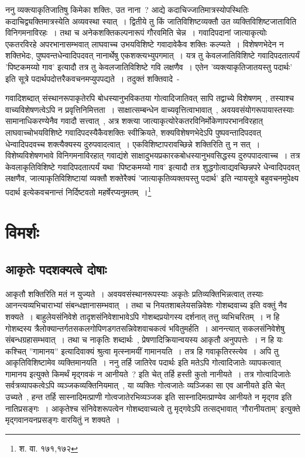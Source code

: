 		ननु व्यक्त्याकृतिजातिषु किमेका शक्तिः, उत नाना~? आद्ये कदाचिज्जातिमात्रस्योपस्थितिः कदाचिद्व्यक्तिमात्रस्येति अव्यवस्था स्यात्~। द्वितीये तु किं जातिविशिष्टव्यक्तौ उत व्यक्तिविशिष्टजाताविति विनिगमनाविरहः~। तथा च अनेकशक्तिकल्पनारूपं गौरवमिति चेन्न~। गवादिपदानां जात्याकृत्योः एकतरविरहे अपरभानासम्भवात् लाघवाच्च उभयविशिष्टे गवादावेकैव शक्तिः कल्प्यते~। विशेषणभेदेन न शक्तिभेदः, पुष्पवन्तधेन्वादिपदवत् नानार्थेषु एकशक्त्यभ्युपगमात्~। यत्र तु केवलजातिविशिष्टे गवादिपदतात्पर्यं 'पिष्टकमय्यो गाव' इत्यादौ तत्र तु केवलजातिविशिष्टे गवि लक्षणैव~। एतेन 'व्यक्त्याकृतिजातयस्तु पदार्थः' इति सूत्रे पदार्थपदोत्तरैकवचनमप्युपपद्यते~। तदुक्तं शक्तिवादे~- 

		{\fontsize{11.7}{0}\selectfont\s  गवादिशब्दात् संस्थानरूपाकृतेरपि बोधस्यानुभविकतया गोत्वादिजातिवत् सापि तद्वाच्ये विशेषणम्~, तस्याश्च वाच्यविशेषणत्वेऽपि न प्रवृत्तिनिमित्तता~। साक्षात्सम्बन्धेन वाच्यवृत्तित्वाभावात्~, अवयवसंयोगरूपायास्तस्याः सामानाधिकरण्येनैव गवादौ सत्त्वात्~, अत्र शक्त्या जात्याकृत्योरेकतरविनिर्मोकेणापरभानविरहात् लाघवाच्चोभयविशिष्टे गवादिपदस्यैकैवशक्तिः स्वीक्रियते, शक्यविशेषणभेदेऽपि पुष्पवन्तादिपदवत् धेन्वादिपदवच्च शक्त्यैक्यस्य दुरुपवादत्वात्~। एकविशिष्टापरावच्छिन्ने शक्तिरिति तु न सत्~। विशेष्यविशेषणभावे विनिगमनाविरहात् गवाद्यंशे साक्षादुभयप्रकारकबोधस्यानुभवसिद्धस्य दुरुपपादत्वाच्च~। तत्र केवलाकृतिविशिष्टे गवादिपदतात्पर्यं यथा 'पिष्टकमय्यो गाव' इत्यादौ तत्र शुद्धगोत्वाद्यवच्छिन्नपरे धेन्वादिपदवत् लक्षणैव, जात्याकृतिविशिष्टायां व्यक्तौ शक्तेरैक्यं 'जात्याकृतिव्यक्तयस्तु पदार्थ' इति न्यायसूत्रे बहुवचनमुपेक्ष्य पदार्थ इत्येकवचनान्तं निर्दिष्टवतो महर्षेरप्यनुमतम्~।\footnote{श. वा. १७१,१७२}}


	\section{विमर्शः}
	
		\subsection{आकृतेः पदशक्यत्वे दोषाः}
		
		आकृतौ शक्तिरिति मतं न युज्यते~। अवयवसंस्थानरूपस्याः अकृतेः प्रतिव्यक्तिभिन्नत्वात्  तस्याः आनन्त्यव्यभिचाराभ्यां संबन्धज्ञानासम्भवात्~। तथा च  नियतशाबलेयसन्निवेशः गोशब्दवाच्य इति वक्तुं नैव शक्यते~। बाहुलेयसंनिवेशे  तादृशसंनिवेशाभावेऽपि  गोशब्दप्रयोगस्य  दर्शनात्  तत्तु व्यभिचरितम्~।  न हि गोशब्दस्य  त्रैलोक्यान्तर्गतसकलगोपिणडगतसन्निवेशवाचकत्वं  भवितुमर्हति~। आनन्त्यात्  सकलसंनिवेशेषु  संबन्धग्रहासम्भवात्~।  तथा च  नाकृतिः शब्दार्थः~, प्रेषणादिक्रियान्वयस्य  आकृतौ अनुपपत्तेः~। न हि यः कश्चित् ”गामानय” इत्यादिवाक्यं श्रुत्वा  मृत्स्नामयीं गामानयति~। तत्र हि गवाकृतिरस्त्येव~। अपि तु आकृतिविशिष्टामेव व्यक्तिमानयति~। ननु तर्हि  जातिरेव पदार्थः इति मतेऽपि  गोत्वादिजातेः व्यापकत्वात् गामानय इत्युक्ते किमर्थं मृद्गवकं  न आनीयते~? इति चेत्  तर्हि हस्ती कुतो नानीयते~। तत्र गोत्वादिजातेः  सर्वत्रव्यापकत्वेऽपि  व्यञ्जकव्यक्तिनियमात्~, या व्यक्तिः गोत्वजातेः व्यञ्जिका सा एव आनीयते इति चेत् उच्यते~,  हन्त तर्हि सास्नादिमत्प्राणी  गोत्वजातेरभिव्यञ्जक  इति सास्नादिमत्प्राण्येव आनीयते  न  मृद्गव  इति नातिप्रसङ्गः~। आकृतेश्च संनिवेशरूपत्वेन  गोशब्दवाच्यत्वे  तु  मृद्गवेऽपि तत्सद्भावात्  'गौरानीयताम्' इत्युक्ते  मृद्गवानयनप्रसङ्गः  वारयितुं न शक्यते~।

